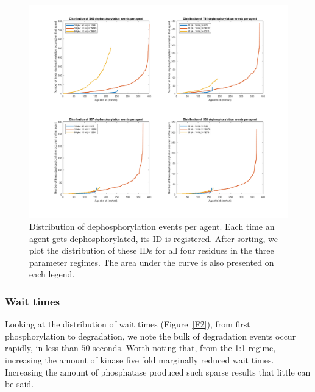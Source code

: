 \begin{figure}[p]
  \centering
  \includegraphics[scale=0.35]{wnt/F1_distribution_dephosphorylations_per_agent}
  \caption{Distribution of dephosphorylation events per agent. Each
    time an agent gets dephosphorylated, its ID is registered. After
    sorting, we plot the distribution of these IDs for all four
    residues in the three parameter regimes. The area under the curve
    is also presented on each legend.}
  \label{F1}
\end{figure}


\subsubsection*{Wait times}
Looking at the distribution of wait times (Figure~\ref{F2}), from first phosphorylation
to degradation, we note the bulk of degradation events occur rapidly,
in less than $50$ seconds. Worth noting that, from the 1:1 regime,
increasing the amount of kinase five fold marginally reduced wait
times. Increasing the amount of phosphatase produced such sparse
results that little can be said.

